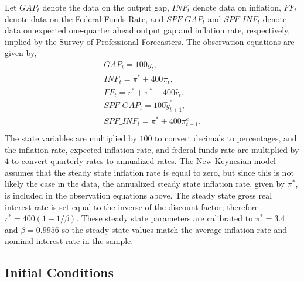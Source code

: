 \documentclass[10pt]{article}
\newcommand{\beq}{\begin{equation}}
\newcommand{\eeq}{\end{equation}}
\newcommand{\h}[1]{\hat{#1}}
\newcommand{\ds}{\displaystyle}
\begin{document}
Let $GAP_t$ denote the data on the output gap, $INF_t$ denote data on inflation, $FF_t$ denote data on the Federal Funds Rate, and $SPF\_GAP_t$ and $SPF\_INF_t$ denote data on expected one-quarter ahead output gap and inflation rate, respectively, implied by the Survey of Professional Forecasters.  The observation equations are given by,
\beq \begin{array}{l} \label{eq:obs}  
\ds GAP_t = 100 \tilde{y}_t, \\
\ds INF_t = \pi^{*} + 400\pi_t, \\
\ds FF_t = r^{*} + \pi^* + 400\h{r}_t.\\
\ds SPF\_GAP_t = 100 \tilde{y}_{t+1}^e, \\
\ds SPF\_INF_t = \pi^{*} + 400\pi_{t+1}^e. \\
\end{array}
\eeq
The state variables are multiplied by $100$ to convert decimals to percentages, and the inflation rate, expected inflation rate, and federal funds rate are multiplied by $4$ to convert quarterly rates to annualized rates.  The New Keynesian model assumes that the steady state inflation rate is equal to zero, but since this is not likely the case in the data, the annualized steady state inflation rate, given by  $\pi^*$, is included in the observation equations above.  The steady state gross real interest rate is set equal to the inverse of the discount factor; therefore $r^* = 400(1-1/\beta)$.  These steady state parameters are calibrated to $\pi^*=3.4$ and $\beta=0.9956$ so the steady state values match the average inflation rate and nominal interest rate in the sample.

\subsection{Initial Conditions}
\end{document}
